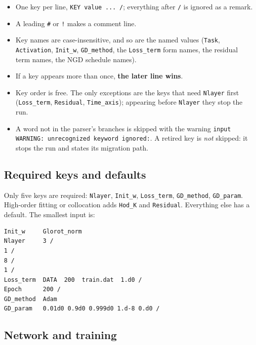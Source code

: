 \documentclass[10pt,a4paper]{article}
\newcommand{\code}[1]{\texttt{#1}}
\begin{document}
\begin{itemize}[leftmargin=1.4em]
\item One key per line, \code{KEY value ... /}; everything after
      \code{/} is ignored as a remark.
\item A leading \code{\#} or \code{!} makes a comment line.
\item Key names are case-insensitive, and so are the named values
      (\code{Task}, \code{Activation}, \code{Init\_w},
      \code{GD\_method}, the \code{Loss\_term} form names, the
      residual term names, the NGD schedule names).
\item If a key appears more than once, \textbf{the later line wins}.
\item Key order is free. The only exceptions are the keys that need
      \code{Nlayer} first (\code{Loss\_term}, \code{Residual},
      \code{Time\_axis}); appearing before \code{Nlayer} they stop
      the run.
\item A word not in the parser's branches is skipped with the warning
      \code{input WARNING: unrecognized keyword ignored:}. A retired
      key is \emph{not} skipped: it stops the run and states its
      migration path.
\end{itemize}

\subsection{Required keys and defaults}

Only five keys are required: \code{Nlayer}, \code{Init\_w},
\code{Loss\_term}, \code{GD\_method}, \code{GD\_param}. High-order
fitting or collocation adds \code{Hod\_K} and \code{Residual}.
Everything else has a default. The smallest input is:

\begin{verbatim}
Init_w     Glorot_norm
Nlayer     3 /
1 /
8 /
1 /
Loss_term  DATA  200  train.dat  1.d0 /
Epoch      200 /
GD_method  Adam
GD_param   0.01d0 0.9d0 0.999d0 1.d-8 0.d0 /
\end{verbatim}

\subsection{Network and training}
\end{document}
